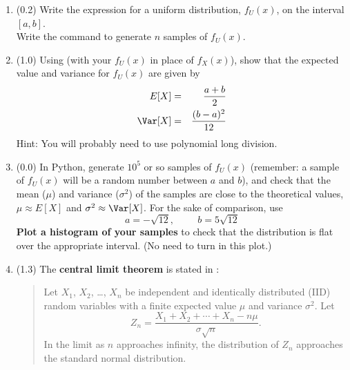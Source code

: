\documentclass[11pt,titlepage,fleqn]{article}
\begin{document}
\begin{enumerate}
\item (0.2) Write the expression for a uniform distribution, $f_U(x)$, on the interval $[a,b]$. \\
Write the command to generate $n$ samples of $f_U(x)$.
\label{fu}


\item (1.0) Using  (with your $f_U(x)$ in place of $f_X(x)$), show that the expected value and variance for $f_U(x)$ are given by
%
\begin{eqnarray}
E[X] &=& \frac{a+b}{2}
\\
\Var[X] &=& \frac{(b-a)^2}{12}
\end{eqnarray}
%
Hint: You will probably need to use polynomial long division.


\item (0.0) In Python, generate $10^5$ or so samples of $f_U(x)$ (remember: a sample of $f_U(x)$ will be a random number between $a$ and $b$), and check that the mean ($\mu$) and variance ($\sigma^2$) of the samples are close to the theoretical values, \ie $\mu \approx E[X]$ and $\sigma^2 \approx \Var[X]$. For the sake of comparison, use
%
\begin{equation*}
a = -\sqrt{12},
\hspace{1cm}
b = 5\sqrt{12}
\end{equation*}
%
{\bf Plot a histogram of your samples} to check that the distribution is flat over the appropriate interval. (No need to turn in this plot.)


\pagebreak
\item (1.3) The {\bf central limit theorem} is stated in \citet[][Section B.6]{Aster}:
%
\begin{quote}
Let $X_1$, $X_2$, \ldots, $X_n$ be independent and identically distributed (IID) random variables with a finite expected value $\mu$ and variance $\sigma^2$. Let
%
\begin{equation}
Z_n = \frac{X_1 + X_2 + \cdots + X_n - n\mu}{\sigma\sqrt{n}}.
\label{Zn}
\end{equation}
%
In the limit as $n$ approaches infinity, the distribution of $Z_n$ approaches the standard normal distribution.
\end{quote}


\end{enumerate}
\end{document}
